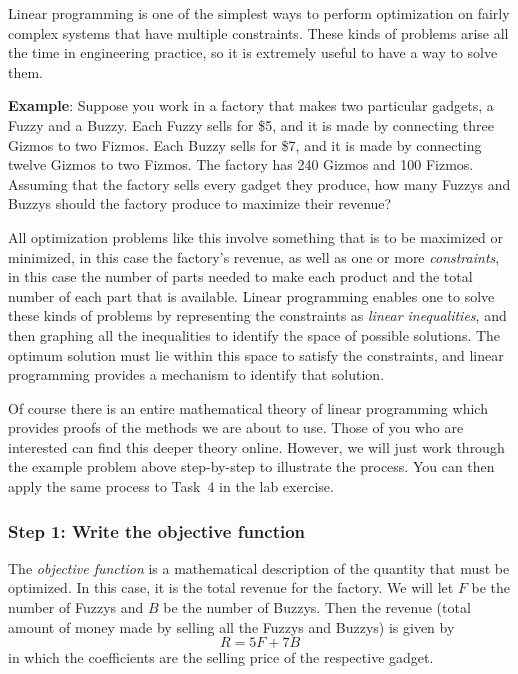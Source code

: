 \documentclass{article}
\begin{document}
Linear programming is one of the simplest ways to perform optimization on fairly complex systems
that have multiple constraints.  These kinds of problems arise all the time in engineering
practice, so it is extremely useful to have a way to solve them.

\textbf{Example}: Suppose you work in a factory that makes two
particular gadgets, a Fuzzy and a Buzzy.  Each Fuzzy sells for \$5, and it is made by
connecting three Gizmos to two Fizmos.  Each Buzzy sells for \$7, and it is made by
connecting twelve Gizmos to two Fizmos.  The factory has 240 Gizmos and 100 Fizmos. 
Assuming that the factory sells every gadget they produce, how many Fuzzys and Buzzys
should the factory produce to maximize their revenue?

All optimization problems like this involve something that is to be maximized or minimized,
in this case the factory's revenue, as well as one or more \textit{constraints}, in this
case the number of parts needed to make each product and the total number of each part
that is available.  Linear programming enables one to solve these kinds of problems by
representing the constraints as \textit{linear inequalities}, and then graphing all the
inequalities to identify the space of possible solutions.  The optimum solution must 
lie within this space to satisfy the constraints, and linear programming provides
a mechanism to identify that solution.

Of course there is an entire mathematical theory of linear programming which provides
proofs of the methods we are about to use.  Those of you who are interested can find
this deeper theory online.
However, we will just work through the example problem above step-by-step to illustrate
the process.  You can then apply the same process to Task~4 in the lab exercise.

\subsubsection*{Step 1: Write the objective function}
The \textit{objective function} is a mathematical description of the quantity that must
be optimized.  In this case, it is the total revenue for the factory.  We will let
$F$ be the number of Fuzzys and $B$ be the number of Buzzys.  Then the revenue (total
amount of money made by selling all the Fuzzys and Buzzys) is given by
\begin{equation}
    R = 5 F + 7 B
    \label{eq:objectivefn}
\end{equation}
in which the coefficients are the selling price of the respective gadget.
\end{document}
